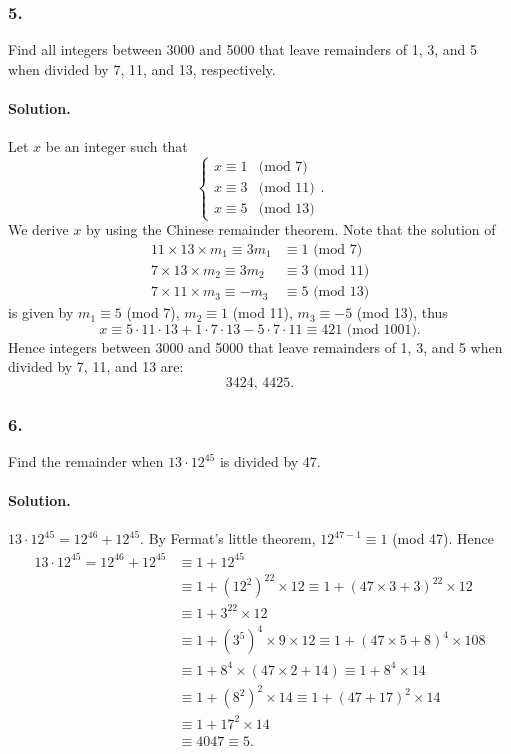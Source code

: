 \subsubsection{5.} Find all integers between 3000 and 5000 that leave remainders of
1, 3, and 5 when divided by 7, 11, and 13, respectively.

\paragraph{Solution.} Let $x$ be an integer such that
\[
    \begin{cases}
        x \equiv 1 & \mbox{(mod 7)} \\
        x \equiv 3 & \mbox{(mod 11)} \\
        x \equiv 5 & \mbox{(mod 13)}
    \end{cases}.
\]
We derive $x$ by using the Chinese remainder theorem. Note that the solution of
\begin{align*}
    11\times 13 \times m_1 \equiv 3m_1 & \equiv 1 \mbox{ (mod 7)} \\
    7\times 13 \times m_2 \equiv 3m_2 & \equiv 3 \mbox{ (mod 11)} \\
    7\times 11 \times m_3 \equiv -m_3 & \equiv 5 \mbox{ (mod 13)}
\end{align*}
is given by $m_1 \equiv 5$ (mod 7), $m_2 \equiv 1$ (mod 11), $m_3 \equiv -5$ (mod 13),
thus
\[
    x \equiv 5\cdot 11\cdot 13 + 1 \cdot 7 \cdot 13 - 5 \cdot 7 \cdot 11 \equiv 421 \mbox{ (mod 1001)}.
\]
Hence integers between 3000 and 5000 that leave remainders of
1, 3, and 5 when divided by 7, 11, and 13 are:
\[
    3424,\, 4425.
\]

\subsubsection{6.} Find the remainder when $13 \cdot 12^{45}$ is divided by 47.

\paragraph{Solution.} $13\cdot 12^{45}=12^{46}+12^{45}$. By Fermat's little theorem, 
$12^{47-1} \equiv 1$ (mod 47). Hence
\begin{align*}
    13\cdot 12^{45}=12^{46}+12^{45} &\equiv 1 + 12^{45} \\
    &\equiv 1+\left(12^2\right)^{22} \times 12 \equiv 1+\left(47 \times 3 + 3\right)^{22} \times 12 \\
    &\equiv 1+ 3^{22} \times 12 \\
    &\equiv 1+ \left(3^5\right)^4 \times 9 \times 12 \equiv 1+\left(47\times 5 + 8\right)^4 \times 108 \\
    &\equiv 1+8^4 \times \left(47 \times 2 + 14\right) \equiv 1 + 8^4 \times 14 \\
    &\equiv 1+\left(8^2\right)^2\times 14 \equiv 1+\left(47+17\right)^2\times 14 \\
    &\equiv 1+17^2\times 14 \\
    &\equiv 4047 \equiv 5.
\end{align*}

